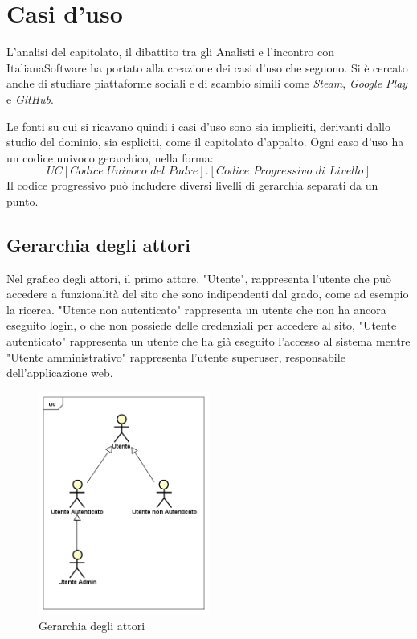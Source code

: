 \documentclass[12pt,a4paper,titlepage]{article}
\begin{document}
	\section{Casi d'uso}
	L'analisi del capitolato, il dibattito tra gli Analisti e l'incontro con ItalianaSoftware ha portato alla creazione dei casi d'uso che seguono. Si è cercato anche di studiare piattaforme sociali e di scambio simili come \textit{Steam}, \textit{Google Play} e \textit{GitHub}.
	
	Le fonti su cui si ricavano quindi i casi d'uso sono sia impliciti, derivanti dallo studio del dominio, sia espliciti, come il capitolato d'appalto.
	Ogni caso d'uso ha un codice univoco gerarchico, nella forma: 
	\[UC[\textit{Codice Univoco del Padre}].[\textit{Codice Progressivo di Livello}]\] 
	Il codice progressivo può includere diversi livelli di gerarchia separati da un punto.
	\subsection{Gerarchia degli attori}
	Nel grafico degli attori, il primo attore, "Utente", rappresenta l'utente che può accedere a funzionalità del sito che sono indipendenti dal grado, come ad esempio la ricerca. "Utente non autenticato" rappresenta un utente che non ha ancora eseguito login, o che non possiede delle credenziali per accedere al sito, "Utente autenticato" rappresenta un utente che ha già eseguito l'accesso al sistema mentre "Utente amministrativo" rappresenta l'utente superuser, responsabile dell'applicazione web.
	\begin{figure}[ht]
		\centering
		\includegraphics[width=0.5\textwidth]{UseCase/Attori}
		\caption{Gerarchia degli attori}
	\end{figure}
	\clearpage
\end{document}
